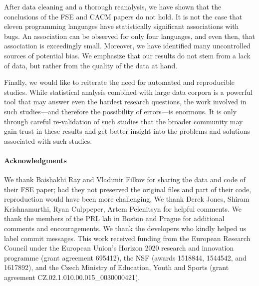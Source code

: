 \documentclass[acmsmall]{acmart}
\begin{document}
After data cleaning and a thorough reanalysis, we have shown that the
conclusions of the FSE and CACM papers do not hold. It is not the case that
eleven programming languages have statistically significant associations
with bugs. An association can be observed for only four languages, and even
then, that association is exceedingly small. Moreover, we have identified
many uncontrolled sources of potential bias.  We emphasize that our results
do not stem from a lack of data, but rather from the quality of the data at
hand.

Finally, we would like to reiterate the need for automated and reproducible
studies. While statistical analysis combined with large data corpora is
a powerful tool that may answer even the hardest research questions, the
work involved in such studies---and therefore the possibility of errors---is
enormous. It is only through careful re-validation of such studies that
the broader community may gain trust in these results and get better insight
into the problems and solutions associated with such studies. 

\paragraph{Acknowledgments} 
We thank Baishakhi Ray and Vladimir Filkov for sharing the data and code of
their FSE paper; had they not preserved the original files and part of their
code, reproduction would have been more challenging.  We thank Derek Jones,
Shiram Krishnamurthi, Ryan Culppeper, Artem Pelenitsyn for helpful comments.
We thank the members of the PRL lab in Boston and Prague for additional
comments and encouragements. We thank the developers who kindly helped us
label commit messages.    This work received
funding from the European Research Council under the European Union's
Horizon 2020 research and innovation programme (grant agreement 695412), the
NSF (awards 1518844, 1544542, and 1617892), and the Czech Ministry of Education,
Youth and Sports (grant agreement CZ.02.1.01\/0.0\/0.0\/15\_003\/0000421).
                                                   

\end{document}
